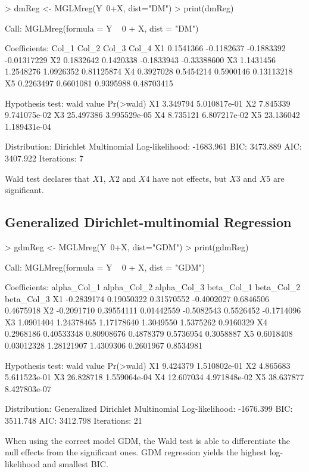 \documentclass[a4paper]{article}
\begin{document}
\begin{Schunk}
\begin{Sinput}
> dmReg <- MGLMreg(Y~0+X, dist="DM")
> print(dmReg)
\end{Sinput}
\begin{Soutput}
Call: MGLMreg(formula = Y ~ 0 + X, dist = "DM")

Coefficients:
       Col_1      Col_2      Col_3       Col_4
X1 0.1541366 -0.1182637 -0.1883392 -0.01317229
X2 0.1832642  0.1420338 -0.1833943 -0.33388600
X3 1.1431456  1.2548276  1.0926352  0.81125874
X4 0.3927028  0.5454214  0.5900146  0.13113218
X5 0.2263497  0.6601081  0.9395988  0.48703415

Hypothesis test: 
   wald value    Pr(>wald)
X1   3.349794 5.010817e-01
X2   7.845339 9.741075e-02
X3  25.497386 3.995529e-05
X4   8.735121 6.807217e-02
X5  23.136042 1.189431e-04

Distribution: Dirichlet Multinomial
Log-likelihood: -1683.961
BIC: 3473.889
AIC: 3407.922
Iterations: 7
\end{Soutput}
\end{Schunk}
Wald test declares that $X1$, $X2$ and $X4$ have not effects, but $X3$ and $X5$ are significant.

\subsection{Generalized Dirichlet-multinomial Regression}

\begin{Schunk}
\begin{Sinput}
> gdmReg <- MGLMreg(Y~0+X, dist="GDM")
> print(gdmReg)
\end{Sinput}
\begin{Soutput}
Call: MGLMreg(formula = Y ~ 0 + X, dist = "GDM")

Coefficients:
   alpha_Col_1 alpha_Col_2 alpha_Col_3 beta_Col_1 beta_Col_2 beta_Col_3
X1  -0.2839174  0.19050322  0.31570552 -0.4002027  0.6846506  0.4675918
X2  -0.2091710  0.39554111  0.01442559 -0.5082543  0.5526452 -0.1714096
X3   1.0901404  1.24378465  1.17178640  1.3049550  1.5375262  0.9160329
X4   0.2968186  0.40533348  0.80908676  0.4878379  0.5736954  0.3058887
X5   0.6018408  0.03012328  1.28121907  1.4309306  0.2601967  0.8534981

Hypothesis test: 
   wald value    Pr(>wald)
X1   9.424379 1.510802e-01
X2   4.865683 5.611523e-01
X3  26.828718 1.559064e-04
X4  12.607034 4.971848e-02
X5  38.637877 8.427803e-07

Distribution: Generalized Dirichlet Multinomial
Log-likelihood: -1676.399
BIC: 3511.748
AIC: 3412.798
Iterations: 21
\end{Soutput}
\end{Schunk}
When using the correct model GDM, the Wald test is able to differentiate the null effects from the significant ones. GDM regression yields the highest log-likelihood and smallest BIC.
\end{document}
